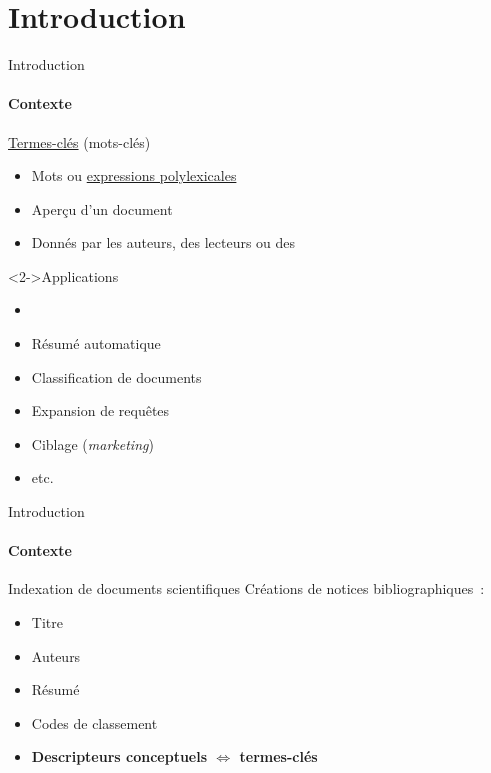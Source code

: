 \section*{Introduction}
  \begin{frame}{Introduction}
    \framesubtitle{Contexte}

    \begin{block}{\underline{Termes-clés} (mots-clés)}
      \begin{itemize}
        \item{Mots ou \underline{expressions polylexicales}}
        \item{Aperçu d'un document}
        \item{Donnés par les auteurs, des lecteurs ou des }
      \end{itemize}
    \end{block}

    \begin{block}<2->{Applications}
      \begin{minipage}{.5\linewidth}
        \begin{itemize}
          \item{}
          \item{Résumé automatique}
          \item{Classification de documents}
        \end{itemize}
      \end{minipage}
      \begin{minipage}{.48\linewidth}
        \begin{itemize}
          \item{Expansion de requêtes}
          \item{Ciblage (\textit{marketing})}
          \item{etc.}
        \end{itemize}
      \end{minipage}
    \end{block}
  \end{frame}

  \begin{frame}{Introduction}
    \framesubtitle{Contexte}

    \begin{block}{Indexation de documents scientifiques}
      Créations de notices bibliographiques~:
      \begin{itemize}
        \item{Titre}
        \item{Auteurs}
        \item{Résumé}
        \item{Codes de classement}
        \item{\textbf{Descripteurs conceptuels $\Leftrightarrow$ termes-clés}}
      \end{itemize}
    \end{block}
  \end{frame}

